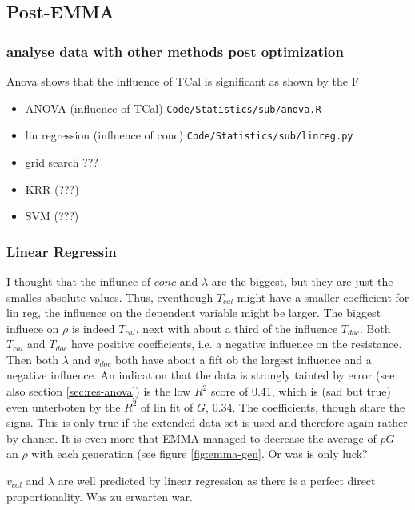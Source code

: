 \subsection{Post-EMMA}
\subsubsection{analyse data with other methods post optimization}
Anova shows that the influence of TCal is significant as shown by the F 
\begin{itemize}
    \item ANOVA (influence of TCal) \texttt{Code/Statistics/sub/anova.R}
    \item lin regression (influence of conc) \texttt{Code/Statistics/sub/linreg.py}
    \item grid search ???
    \item KRR (???)
    \item SVM (???)
\end{itemize}

\subsubsection{Linear Regressin}
I thought that the influnce of $conc$ and $\lambda$ are the biggest, but they are just the smalles absolute values. 
Thus, eventhough $T_{cal}$ might have a smaller coefficient for lin reg, the influence on the dependent variable might be larger. 
The biggest influece on $\rho$ is indeed $T_{cal}$, next with about a third of the influence $T_{doc}$. 
Both $T_{cal}$ and $T_{doc}$ have positive coefficients, i.e. a negative influence on the resistance. 
Then both $\lambda$ and $v_{doc}$ both have about a fift ob the largest influence and a negative influence. 
An indication that the data is strongly tainted by error (see also section \ref{sec:res-anova}) is the low $R^2$ score of 0.41, 
which is (sad but true) even unterboten by the $R^2$ of lin fit of $G$, 0.34. 
The coefficients, though share the signs. 
This is only true if the extended data set is used and therefore again rather by chance. 
It is even more  that EMMA managed to decrease the average of $pG$ an $\rho$ with each generation (see figure \ref{fig:emma-gen}. 
Or was is only luck? 

$v_{cal}$ and $\lambda$ are well predicted by linear regression as there is a perfect direct proportionality. 
Was zu erwarten war. 


